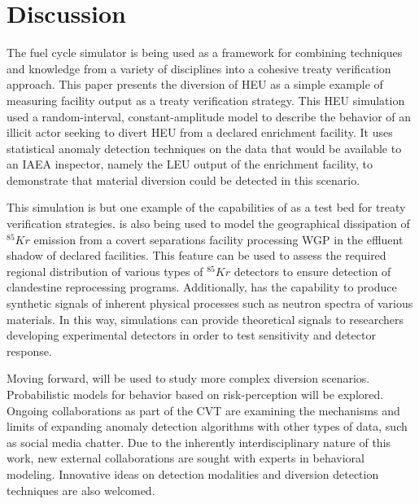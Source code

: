 \section{Discussion}
\label{s_dis}

The \Cyclus fuel cycle simulator is being used as a framework for combining techniques and knowledge from a variety of disciplines into a cohesive treaty verification approach. This paper presents the diversion of \gls{HEU} as a simple example of measuring facility output as a treaty verification strategy.  This \gls{HEU} simulation used a random-interval, constant-amplitude model to describe the behavior of an illicit actor seeking to divert \gls{HEU} from a declared enrichment facility.  It uses statistical anomaly detection techniques on the data that would be available to an \gls{IAEA} inspector, namely the \gls{LEU} output of the enrichment facility, to demonstrate that material diversion could be detected in this scenario.

This simulation is but one example of the capabilities of \Cyclus as a test bed for treaty verification strategies.  \Cyclus is also being used to model the geographical dissipation of $^{85}Kr$ emission from a covert separations facility processing \gls{WGP} in the effluent shadow of declared facilities.  This feature can be used to assess the required regional distribution of various types of $^{85}Kr$ detectors to ensure detection of clandestine reprocessing programs.  Additionally, \Cyclus has the capability to produce synthetic signals of inherent physical processes such as neutron spectra of various materials.  In this way, \Cyclus simulations can provide theoretical signals to researchers developing experimental detectors in order to test sensitivity and detector response.

Moving forward, \Cyclus will be used to study more complex diversion scenarios.  Probabilistic models for behavior based on risk-perception will be explored.  Ongoing collaborations as part of the \gls{CVT} are examining the mechanisms and limits of expanding anomaly detection algorithms with other types of data, such as social media chatter.  Due to the inherently interdisciplinary nature of this work, new external collaborations are sought with experts in behavioral modeling. Innovative ideas on detection modalities and diversion detection techniques are also welcomed.



\textit{}